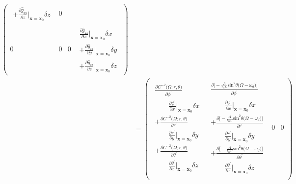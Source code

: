 \documentclass[english]{article}
\begin{document}
\begin{align*}
\begin{pmatrix}
\begin{array}{c}
+\frac{\partial\hat{g}_{yy}}{\partial z}\big|_{\boldsymbol{x}=\boldsymbol{x}_{0}}\delta z
\end{array} & 0\\
0 & 0 & 0 & \begin{array}{c}
\frac{\partial\hat{g}_{zz}}{\partial x}\big|_{\boldsymbol{x}=\boldsymbol{x}_{0}}\delta x\\
+\frac{\partial\hat{g}_{zz}}{\partial y}\big|_{\boldsymbol{x}=\boldsymbol{x}_{0}}\delta y\\
+\frac{\partial\hat{g}_{zz}}{\partial z}\big|_{\boldsymbol{x}=\boldsymbol{x}_{0}}\delta z
\end{array}
\end{pmatrix}\\
 & =\begin{pmatrix}\begin{array}{c}
\frac{\partial C^{-2}\biggl(\Omega;r,\theta\biggr)}{\partial\phi^{'}}\\
\qquad\frac{\partial\phi^{'}}{\partial x}\big|_{\boldsymbol{x}=\boldsymbol{x}_{0}}\delta x\\
+\frac{\partial C^{-2}\biggl(\Omega;r,\theta\biggr)}{\partial r^{'}}\\
\qquad\frac{\partial r^{'}}{\partial y}\big|_{\boldsymbol{x}=\boldsymbol{x}_{0}}\delta y\\
+\frac{\partial C^{-2}\biggl(\Omega;r,\theta\biggr)}{\partial\theta^{'}}\\
\qquad\frac{\partial\theta^{'}}{\partial z}\big|_{\boldsymbol{x}=\boldsymbol{x}_{0}}\delta z
\end{array} & \begin{array}{c}
\frac{\partial\biggl[-\frac{A}{r_{0}\Sigma}\text{sin}^{2}\theta\biggl(\Omega-\omega_{d}\biggr)\biggr]}{\partial\phi^{'}}\\
\qquad\frac{\partial\phi^{'}}{\partial x}\big|_{\boldsymbol{x}=\boldsymbol{x}_{0}}\delta x\\
+\frac{\partial\biggl[-\frac{A}{r_{0}\Sigma}\text{sin}^{2}\theta\biggl(\Omega-\omega_{d}\biggr)\biggr]}{\partial r^{'}}\\
\qquad\frac{\partial r^{'}}{\partial y}\big|_{\boldsymbol{x}=\boldsymbol{x}_{0}}\delta y\\
+\frac{\partial\biggl[-\frac{A}{r_{0}\Sigma}\text{sin}^{2}\theta\biggl(\Omega-\omega_{d}\biggr)\biggr]}{\partial\theta^{'}}\\
\qquad\frac{\partial\theta^{'}}{\partial z}\big|_{\boldsymbol{x}=\boldsymbol{x}_{0}}\delta z
\end{array} & 0 & 0\\

\end{pmatrix}
\end{align*}
\end{document}
